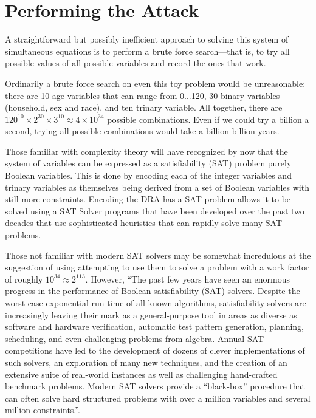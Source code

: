 \documentclass[runningheads]{llncs}
\begin{document}
\section{Performing the Attack}
A straightforward but possibly inefficient approach to solving this
system of simultaneous equations is to perform a brute force
search---that is, to try all possible values of all possible variables
and record the ones that work.

Ordinarily a brute force search on even this toy problem would be
unreasonable: there are 10 age variables that can range from 0...120,
30 binary variables (household, sex and race), and ten trinary
variable. All together, there are $120^{10} \times 2^{30} \times
3^{10} \approx 4 \times 10^{34}$ possible combinations. Even if we
could try a billion a second, trying all possible combinations would
take a billion billion years.

Those familiar with complexity theory will have recognized by now that
the system of variables can be expressed as a satisfiability (SAT)
problem purely Boolean variables. This is done by encoding each of the
integer variables and trinary variables as themselves being derived
from a set of Boolean variables with still more constraints. Encoding
the DRA has a SAT problem allows it to be solved using a SAT Solver
programs that have been developed over the past two
decades that use sophisticated heuristics that can rapidly solve many
SAT problems. 

Those not familiar with modern SAT solvers may be somewhat
incredulous at the suggestion of using attempting to use them to solve
a problem with a work factor of roughly $10^{34}\approx2^{113}$.
However, ``The past few years have seen an enormous progress in the performance
of Boolean satisfiability (SAT) solvers. Despite the worst-case
exponential run time of all known algorithms, satisfiability solvers
are increasingly leaving their mark as a general-purpose tool in areas
as diverse as software and hardware verification,
automatic test pattern generation, planning,
scheduling, and even challenging problems from algebra. Annual SAT
competitions have led to the development of dozens 
of clever implementations of such solvers, an exploration of many new
techniques, and the creation of an extensive suite of real-world
instances as well as challenging hand-crafted benchmark
problems. Modern SAT solvers provide a ``black-box'' procedure that
can often solve hard structured problems with over a million variables and
several million constraints.''\cite[references omitted]{Gomes200889}.
\end{document}
